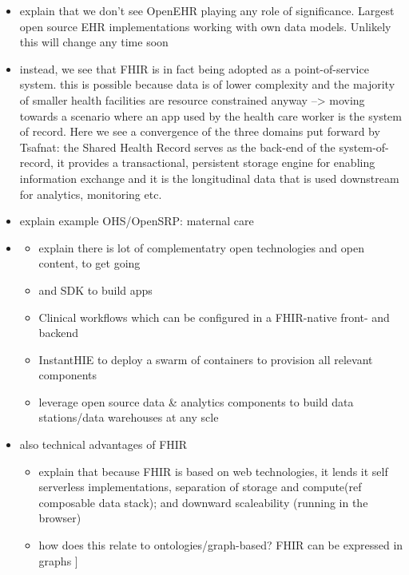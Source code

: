 \documentclass[
  authoryear]{elsarticle}
\providecommand{\tightlist}{%
  \setlength{\itemsep}{0pt}\setlength{\parskip}{0pt}}\usepackage{longtable,booktabs,array}
\begin{document}
\begin{itemize}
\tightlist
\item
  explain that we don't see OpenEHR playing any role of significance.
  Largest open source EHR implementations working with own data models.
  Unlikely this will change any time soon
  \citep{syzdykova2017opensource}
\item
  instead, we see that FHIR is in fact being adopted as a
  point-of-service system. this is possible because data is of lower
  complexity and the majority of smaller health facilities are resource
  constrained anyway --\textgreater{} moving towards a scenario where an
  app used by the health care worker is the system of record. Here we
  see a convergence of the three domains put forward by Tsafnat: the
  Shared Health Record serves as the back-end of the system-of-record,
  it provides a transactional, persistent storage engine for enabling
  information exchange and it is the longitudinal data that is used
  downstream for analytics, monitoring etc.
\item
  explain example OHS/OpenSRP: maternal care
\item
  \begin{itemize}
  \tightlist
  \item
    explain there is lot of complementatry open technologies and open
    content, to get going
  \item
    and SDK to build apps
  \item
    Clinical workflows which can be configured in a FHIR-native front-
    and backend
  \item
    InstantHIE to deploy a swarm of containers to provision all relevant
    components
  \item
    leverage open source data \& analytics components to build data
    stations/data warehouses at any scle
  \end{itemize}
\item
  also technical advantages of FHIR

  \begin{itemize}
  \tightlist
  \item
    explain that because FHIR is based on web technologies, it lends it
    self serverless implementations, separation of storage and
    compute(ref composable data stack); and downward scaleability
    (running in the browser)
  \item
    how does this relate to ontologies/graph-based? FHIR can be
    expressed in graphs \citep{gebreslassie2023fhir4fair}{]}
  \end{itemize}
\end{itemize}
\end{document}
